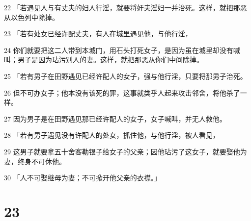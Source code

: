 \par 22 「若遇见人与有丈夫的妇人行淫，就要将奸夫淫妇一并治死。这样，就把那恶从以色列中除掉。
\par 23 「若有处女已经许配丈夫，有人在城里遇见他，与他行淫，
\par 24 你们就要把这二人带到本城门，用石头打死女子，是因为虽在城里却没有喊叫；男子是因为玷污别人的妻。这样，就把那恶从你们中间除掉。
\par 25 「若有男子在田野遇见已经许配人的女子，强与他行淫，只要将那男子治死。
\par 26 但不可办女子；他本没有该死的罪，这事就类乎人起来攻击邻舍，将他杀了一样。
\par 27 因为男子是在田野遇见那已经许配人的女子，女子喊叫，并无人救他。
\par 28 「若有男子遇见没有许配人的处女，抓住他，与他行淫，被人看见，
\par 29 这男子就要拿五十舍客勒银子给女子的父亲；因他玷污了这女子，就要娶他为妻，终身不可休他。
\par 30 「人不可娶继母为妻；不可掀开他父亲的衣襟。」

\chapter{23}

